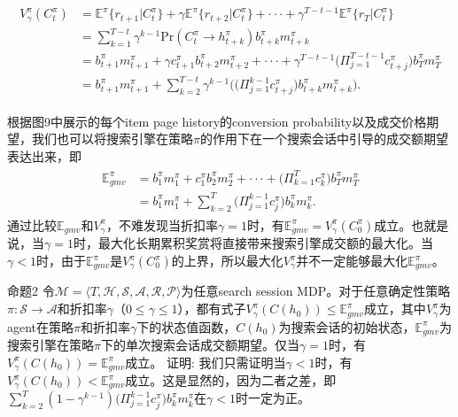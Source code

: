 \begin{align}
\begin{split}
V^{\pi}_{\gamma}(C^{\pi}_t) &= \mathbb{E}^{\pi} \big\{ r_{t+1} \big| C^{\pi}_t \big\} + \gamma \mathbb{E}^{\pi} \big\{r_{t+2} \big| C^{\pi}_t \big\} + \cdot\cdot\cdot + \gamma^{T-t-1} \mathbb{E}^{\pi} \big\{ r_{T} \big| C^{\pi}_t \big\} \\
&= \sum^{T-t}_{k=1} \gamma^{k-1} \text{Pr}(C^{\pi}_t \rightarrow h^{\pi}_{t+k}) b^{\pi}_{t+k} m^{\pi}_{t+k} \\
&= b^{\pi}_{t+1} m^{\pi}_{t+1} + \gamma c^{\pi}_{t+1} b^{\pi}_{t+2} m^{\pi}_{t+2} + \cdot\cdot\cdot + \gamma^{T-t-1} \big( \Pi^{T-t-1}_{j=1} c^{\pi}_{t+j} \big) b^{\pi}_{T} m^{\pi}_{T} \\
&= b^{\pi}_{t+1} m^{\pi}_{t+1} + \sum^{T-t}_{k=2} \gamma^{k-1} \Big( \big( \Pi^{k-1}_{j=1} c^{\pi}_{t+j} \big) b^{\pi}_{t+k} m^{\pi}_{t+k} \Big).
\end{split}
\end{align}

根据图9中展示的每个item page history的conversion probability以及成交价格期望，我们也可以将搜索引擎在策略$\pi$的作用下在一个搜索会话中引导的成交额期望表达出来，即
\begin{align}
\begin{split}
\mathbb{E}^{\pi}_{gmv} &= b^{\pi}_{1} m^{\pi}_1 + c^{\pi}_1 b^{\pi}_2 m^{\pi}_2 + \cdot\cdot\cdot + \big( \Pi_{k=1}^{T} c^{\pi}_k \big) b^{\pi}_T m^{\pi}_T \\
&= b^{\pi}_{1} m^{\pi}_1 + \sum_{k=2}^{T} \big( \Pi_{j=1}^{k-1} c^{\pi}_j \big) b^{\pi}_k m^{\pi}_k.
\end{split}
\end{align}
 通过比较$\mathbb{E}_{gmv}$和$V^{\pi}_{\gamma}$，不难发现当折扣率$\gamma = 1$时，有$\mathbb{E}^{\pi}_{gmv} = V^{\pi}_{\gamma}(C^{\pi}_0)$成立。也就是说，当$\gamma = 1$时，最大化长期累积奖赏将直接带来搜索引擎成交额的最大化。当$\gamma < 1$时，由于$\mathbb{E}^{\pi}_{gmv}$是$V^{\pi}_{\gamma}(C^{\pi}_0)$的上界，所以最大化$V^{\pi}_{\gamma}$并不一定能够最大化$\mathbb{E}^{\pi}_{gmv}$。

命题2
令$\mathcal{M} = \langle T, \mathcal{H}, \mathcal{S}, \mathcal{A}, \mathcal{R}, \mathcal{P} \rangle$为任意search session MDP。对于任意确定性策略$\pi : \mathcal{S} \rightarrow \mathcal{A}$和折扣率$\gamma$（$0 \leq \gamma \leq 1$），都有式子$V^{\pi}_{\gamma}(C(h_0)) \leq \mathbb{E}^{\pi}_{gmv}$成立，其中$V^{\pi}_{\gamma}$为agent在策略$\pi$和折扣率$\gamma$下的状态值函数，$C(h_0)$为搜索会话的初始状态，$\mathbb{E}^{\pi}_{gmv}$为搜索引擎在策略$\pi$下的单次搜索会话成交额期望。仅当$\gamma = 1$时，有$V^{\pi}_{\gamma}(C(h_0)) = \mathbb{E}^{\pi}_{gmv}$成立。
证明:
我们只需证明当$\gamma < 1$时，有$V^{\pi}_{\gamma}(C(h_0)) < \mathbb{E}^{\pi}_{gmv}$成立。这是显然的，因为二者之差，即$\sum_{k=2}^{T} (1 - \gamma^{k-1} ) \big( \Pi_{j=1}^{k-1} c^{\pi}_j \big) b^{\pi}_k m^{\pi}_k$在$\gamma < 1$时一定为正。

